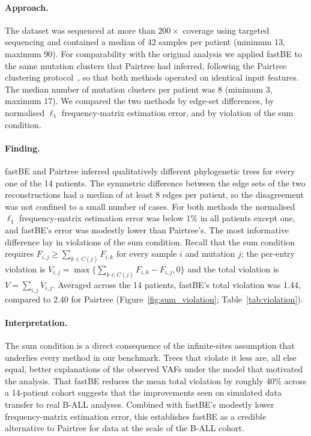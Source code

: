 \documentclass[11pt]{article}
\begin{document}
\paragraph{Approach.}
The dataset was sequenced at more than $200\times$ coverage using targeted sequencing and contained a median of 42 samples per patient (minimum 13, maximum 90). For comparability with the original analysis we applied fastBE to the same mutation clusters that Pairtree had inferred, following the Pairtree clustering protocol~\citep{kulman2022pairtreeprotocol}, so that both methods operated on identical input features. The median number of mutation clusters per patient was 8 (minimum 3, maximum 17). We compared the two methods by edge-set differences, by normalised $\ell_1$ frequency-matrix estimation error, and by violation of the sum condition.

\paragraph{Finding.}
fastBE and Pairtree inferred qualitatively different phylogenetic trees for every one of the 14 patients. The symmetric difference between the edge sets of the two reconstructions had a median of at least 8 edges per patient, so the disagreement was not confined to a small number of cases. For both methods the normalised $\ell_1$ frequency-matrix estimation error was below 1\% in all patients except one, and fastBE's error was modestly lower than Pairtree's. The most informative difference lay in violations of the sum condition. Recall that the sum condition requires $F_{i,j}\geq \sum_{k\in C(j)} F_{i,k}$ for every sample $i$ and mutation $j$; the per-entry violation is $V_{i,j}=\max\{\sum_{k\in C(j)} F_{i,k} - F_{i,j}, 0\}$ and the total violation is $V = \sum_{i,j} V_{i,j}$. Averaged across the 14 patients, fastBE's total violation was 1.44, compared to 2.40 for Pairtree (Figure~\ref{fig:sum_violation}; Table~\ref{tab:violation}).

\paragraph{Interpretation.}
The sum condition is a direct consequence of the infinite-sites assumption that underlies every method in our benchmark. Trees that violate it less are, all else equal, better explanations of the observed VAFs under the model that motivated the analysis. That fastBE reduces the mean total violation by roughly 40\% across a 14-patient cohort suggests that the improvements seen on simulated data transfer to real B-ALL analyses. Combined with fastBE's modestly lower frequency-matrix estimation error, this establishes fastBE as a credible alternative to Pairtree for data at the scale of the B-ALL cohort.
\end{document}

